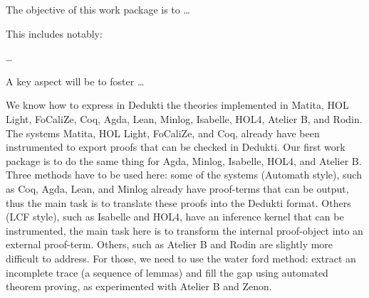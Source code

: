 \begin{workpackage}[id=instrumentation,wphases=0-48,type=RTD,
  short=Instrument Provers,%
  title=Instrument proof systems to produce Dedukti proof,
  lead=Inr,
  InrRM=10,
  DelRM=48,
  GURM=48]
  

\begin{wpobjectives}
  The objective of this work package is to \ldots

This includes notably:
  \begin{compactitem}
  \item \ldots
  \end{compactitem}
  A key aspect will be to foster \ldots
\end{wpobjectives}


\begin{wpdescription}
We know how to express in Dedukti the theories implemented in Matita,
HOL Light, FoCaliZe, Coq, Agda, Lean, Minlog, Isabelle, HOL4,
Atelier B, and Rodin. The systems Matita, HOL Light, FoCaliZe, and
Coq, already have been instrumented to export proofs that can be
checked in Dedukti. Our first work package is to do the same thing for
Agda, Minlog, Isabelle, HOL4, and Atelier B.
Three methods have to be used here: some of the systems
(Automath style), such as Coq, Agda, Lean, and Minlog already have
proof-terms that can be output, thus the main task is to translate
these proofs into the Dedukti format. Others (LCF style), such as
Isabelle and HOL4, have an inference kernel that can be
instrumented, the main task here is to transform
the internal proof-object into an external proof-term. Others, such as
Atelier B and Rodin are slightly more difficult to address. For those,
we need to use the water ford method: extract an incomplete trace (a
sequence of lemmas) and fill the gap using automated theorem proving,
as experimented with Atelier B and Zenon.
\end{wpdescription}

\begin{tasklist}
\begin{task}[id=agda,title=instrument Agda]

\end{task}


\end{tasklist}
\end{workpackage}
